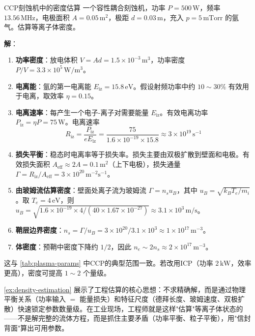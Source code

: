 \begin{example}{CCP刻蚀机中的密度估算}{}{}
\label{ex:density-estimation}
一个容性耦合刻蚀机，功率 $P = 500\,\mathrm{W}$，频率 $13.56\,\mathrm{MHz}$，电极面积 $A = 0.05\,\mathrm{m^2}$，极距 $d = 0.03\,\mathrm{m}$，充入 $p = 5\,\mathrm{mTorr}$ 的氩气。估算等离子体密度。

\textbf{解}：
\begin{enumerate}
\item \textbf{功率密度}：放电体积 $V = A d = 1.5\times 10^{-3}\,\mathrm{m^3}$，功率密度 $P/V = 3.3\times 10^5\,\mathrm{W/m^3}$。
\item \textbf{电离能}：氩的第一电离能 $E_{\text{iz}} = 15.8\,\mathrm{eV}$。假设射频功率中约 $10\sim 30\%$ 有效用于电离，取效率 $\eta = 0.15$。
\item \textbf{电离速率}：每产生一个电子-离子对需要能量 $E_{\text{iz}}$。有效电离功率 $P_{\text{iz}} = \eta P = 75\,\mathrm{W}$。电离速率
\begin{equation}
R_{\text{iz}} = \frac{P_{\text{iz}}}{e E_{\text{iz}}} = \frac{75}{1.6\times 10^{-19} \times 15.8} \approx 3\times 10^{19}\,\mathrm{s^{-1}}
\end{equation}
\item \textbf{损失平衡}：稳态时电离率等于损失率。损失主要由双极扩散到壁面和电极。有效损失面积 $A_{\text{eff}} \approx 2A = 0.1\,\mathrm{m^2}$（上下电极），损失通量 $\Gamma = R_{\text{iz}}/A_{\text{eff}} = 3\times 10^{20}\,\mathrm{m^{-2}s^{-1}}$。
\item \textbf{由玻姆流估算密度}：壁面处离子流为玻姆流 $\Gamma = n_s u_B$，其中 $u_B = \sqrt{k_B T_e/m_i}$。取 $T_e = 4\,\mathrm{eV}$，则 $u_B = \sqrt{1.6\times 10^{-19}\times 4/(40\times 1.67\times 10^{-27})} \approx 3.1\times 10^3\,\mathrm{m/s}$。
\item \textbf{鞘层边界密度}：$n_s = \Gamma/u_B = 3\times 10^{20}/3.1\times 10^3 \approx 1\times 10^{17}\,\mathrm{m^{-3}}$。
\item \textbf{体密度}：预鞘中密度下降约 $1/2$，因此 $n_e \sim 2 n_s \approx 2\times 10^{17}\,\mathrm{m^{-3}}$。
\end{enumerate}

这与 \cref{tab:plasma-params} 中CCP的典型范围一致。若改用ICP（功率 $2\,\mathrm{kW}$，效率更高），密度可提高 $1\sim 2$ 个量级。
\end{example}

\begin{insight}{}{}
\cref{ex:density-estimation} 展示了工程估算的核心思想：不求精确解，而是通过物理平衡关系（功率输入 $=$ 能量损失）和特征尺度（德拜长度、玻姆速度、双极扩散）快速锁定参数数量级。在工业现场，工程师就是这样"估算"等离子体状态的——不是解完整的流体方程，而是抓住主要矛盾（功率平衡、粒子平衡），用"信封背面"算出可用参数。
\end{insight}

